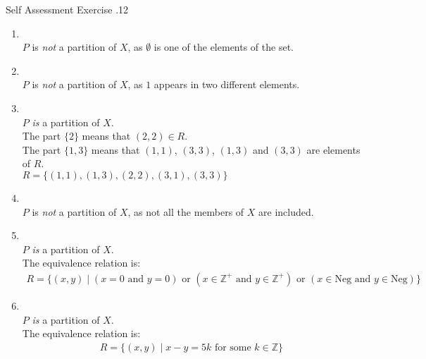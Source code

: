 \documentclass[\main/notes.tex]{subfiles}
\begin{document}
					\begin{exercise}{Self Assessment Exercise \thechapter.12}
						\begin{enumerate}[label=(\alph*)]
							\item {}\\
								$P$ is \emph{not} a partition of $X$, as $\emptyset$ is one of the elements of the set.
							\item {}\\
								$P$ is \emph{not} a partition of $X$, as $1$ appears in two different elements.
							\item {}\\
								$P$ \emph{is} a partition of $X$.\\
								The part $\{2\}$ means that $(2, 2) \in R$.\\
								The part $\{1, 3\}$ means that $(1, 1)$, $(3, 3)$, $(1, 3)$ and $(3, 3)$ are elements of $R$.\\
								$R = \bigl\{(1, 1), (1, 3), (2, 2), (3, 1), (3, 3)\bigr\}$
							\item {}\\
								$P$ is \emph{not} a partition of $X$, as not all the members of $X$ are included.
							\item {}\\
								$P$ \emph{is} a partition of $X$.\\
								The equivalence relation is:
								\begin{align*}
									R = \bigl\{(x, y) \mid (x = 0 \text{ and } y = 0) \text{ or } (x \in \mathbb{Z}^{+} \text{ and } y \in \mathbb{Z}^{+}) \text{ or } (x \in \mathrm{Neg} \text{ and } y \in \mathrm{Neg})\bigr\}
								\end{align*}
							\item {}\\
								$P$ \emph{is} a partition of $X$.\\
								The equivalence relation is:
								\begin{align*}
									R = \bigl\{(x, y) \mid x - y = 5k \text{ for some } k \in \mathbb{Z}\bigr\}
								\end{align*}
						\end{enumerate}
					\end{exercise}
		\pagebreak
\end{document}
